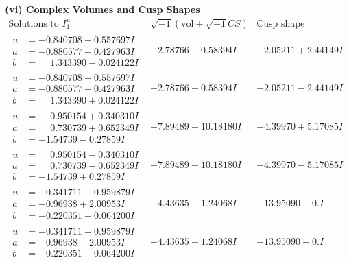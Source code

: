\documentclass[1p]{elsarticle_modified}
\theoremstyle{definition}
\newcommand{\I}{\sqrt{-1}}
\begin{document}
\newpage\flushleft \textbf{(vi) Complex Volumes and Cusp Shapes}
$$\begin{array}{c|c|c}  
\text{Solutions to }I^u_{1}& \I (\text{vol} + \sqrt{-1}CS) & \text{Cusp shape}\\
 \hline 
\begin{aligned}
u &= -0.840708 + 0.557697 I \\
a &= -0.880577 - 0.427963 I \\
b &= \phantom{-}1.343390 - 0.024122 I\end{aligned}
 & -2.78766 - 0.58394 I & -2.05211 + 2.44149 I \\ \hline\begin{aligned}
u &= -0.840708 - 0.557697 I \\
a &= -0.880577 + 0.427963 I \\
b &= \phantom{-}1.343390 + 0.024122 I\end{aligned}
 & -2.78766 + 0.58394 I & -2.05211 - 2.44149 I \\ \hline\begin{aligned}
u &= \phantom{-}0.950154 + 0.340310 I \\
a &= \phantom{-}0.730739 + 0.652349 I \\
b &= -1.54739 - 0.27859 I\end{aligned}
 & -7.89489 - 10.18180 I & -4.39970 + 5.17085 I \\ \hline\begin{aligned}
u &= \phantom{-}0.950154 - 0.340310 I \\
a &= \phantom{-}0.730739 - 0.652349 I \\
b &= -1.54739 + 0.27859 I\end{aligned}
 & -7.89489 + 10.18180 I & -4.39970 - 5.17085 I \\ \hline\begin{aligned}
u &= -0.341711 + 0.959879 I \\
a &= -0.96938 + 2.00953 I \\
b &= -0.220351 + 0.064200 I\end{aligned}
 & -4.43635 - 1.24068 I & -13.95090 + 0. I\phantom{ +0.000000I} \\ \hline\begin{aligned}
u &= -0.341711 - 0.959879 I \\
a &= -0.96938 - 2.00953 I \\
b &= -0.220351 - 0.064200 I\end{aligned}
 & -4.43635 + 1.24068 I & -13.95090 + 0. I\phantom{ +0.000000I} \\ \hline\begin{aligned}

\end{aligned}
\end{array}$$
\end{document}
